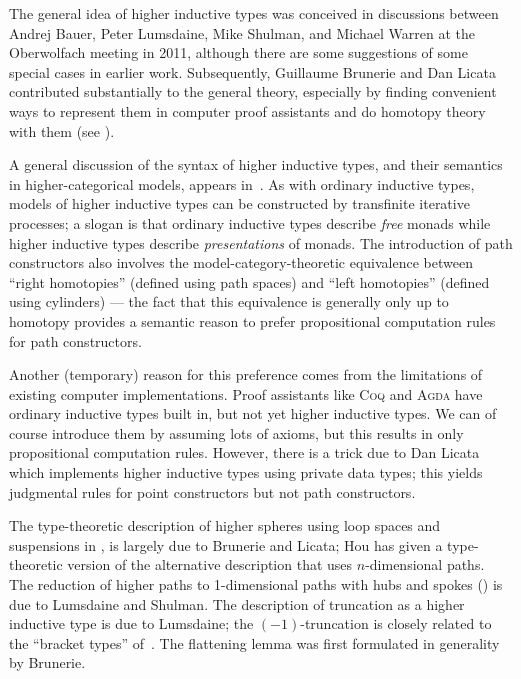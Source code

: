 \documentclass[12pt]{article}
\newcommand{\Agda}{\textsc{Agda}\xspace}
\newcommand{\Coq}{\textsc{Coq}\xspace}
\begin{document}
The general idea of higher inductive types was conceived in discussions between Andrej Bauer, Peter Lumsdaine, Mike Shulman, and Michael Warren at the Oberwolfach meeting in 2011, although there are some suggestions of some special cases in earlier work.  Subsequently, Guillaume Brunerie and Dan Licata contributed substantially to the general theory, especially by finding convenient ways to represent them in computer proof assistants
and do homotopy theory with them (see ).

A general discussion of the syntax of higher inductive types, and their semantics in higher-categorical models, appears in~\cite{ls:hits}.
As with ordinary inductive types, models of higher inductive types can be constructed by transfinite iterative processes; a slogan is that ordinary inductive types describe \emph{free} monads while higher inductive types describe \emph{presentations} of monads.%
The introduction of path constructors also involves the model-category-theoretic equivalence between ``right homotopies'' (defined using path spaces) and ``left homotopies'' (defined using cylinders) --- the fact that this equivalence is generally only up to homotopy provides a semantic reason to prefer propositional computation rules for path constructors.

Another (temporary) reason for this preference comes from the limitations of existing computer implementations.
Proof assistants like \Coq and \Agda have ordinary inductive types built in, but not yet higher inductive types.
We can of course introduce them by assuming lots of axioms, but this results in only propositional computation rules.
However, there is a trick due to Dan Licata which implements higher inductive types using private data types; this yields judgmental rules for point constructors but not path constructors.

The type-theoretic description of higher spheres using loop spaces and suspensions in , is largely due to  Brunerie and  Licata; Hou has given a type-theoretic version of the alternative description that uses $n$-dimensional paths.
The reduction of higher paths to 1-dimensional paths with hubs and spokes () is due to  Lumsdaine and  Shulman.
The description of truncation as a higher inductive type is due to  Lumsdaine; the $(-1)$-truncation is closely related to the ``bracket types'' of~\cite{ab:bracket-types}.
The flattening lemma was first formulated in generality by  Brunerie.
\end{document}
